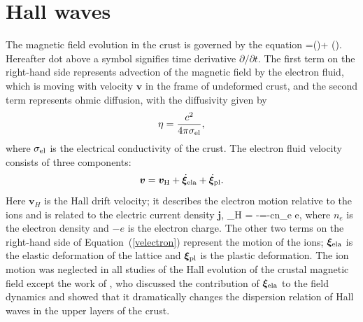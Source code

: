 \section{Hall waves}
\label{dyn}
The magnetic field evolution in the crust is governed by the equation
\beq
{}=\nabla\times\left(\times{}\right)+
\nabla\times\left(\eta\nabla\times{}\right).
\eeq
Hereafter dot above a symbol signifies time derivative $\partial/\partial t$.
The first term on the right-hand side represents advection of the magnetic field by the 
electron fluid, which is moving with 
velocity $\boldsymbol{v}$ in the frame of undeformed crust, 
and the second term represents  
ohmic diffusion, with the diffusivity given by
\begin{equation}
\eta={c^2\over 4\pi \sigma_{\rm el}}, 
\end{equation}
where
$\sigma_{\rm el}$ is the electrical conductivity of the crust. The electron fluid velocity consists of three components: \begin{equation}
\boldsymbol{v}=\boldsymbol{v}_{\rm H}+\dot{\boldsymbol{\xi}}_{\rm ela}+\dot{\boldsymbol{\xi}}_{\rm pl}.
\label{velectron}
\end{equation}
 Here $\boldsymbol{v}_H$ is the Hall drift velocity; it describes the electron motion
 relative to the ions and is related to the 
 electric current density $\boldsymbol{j}$,
\beq
{}_{H} = -=-{c\pi n_e e}\nabla\times{},
\eeq
where $n_e$ is the electron density and 
$-e$ is the electron charge. 
The other two terms on the right-hand side of Equation~(\ref{velectron})
represent the motion of the ions; $\boldsymbol{\xi}_{\rm ela}$ is the elastic deformation 
of the lattice and $\boldsymbol{\xi}_{\rm pl}$ is the plastic deformation.
The ion motion was
neglected in all studies of the Hall evolution of the crustal 
magnetic field except the work of \citet{2004ApJ...609..999C}, who discussed the 
contribution of 
$\boldsymbol{\xi}_{\rm ela}$ to the field dynamics and showed that it 
dramatically changes the dispersion relation of Hall waves in the upper layers of the crust.

